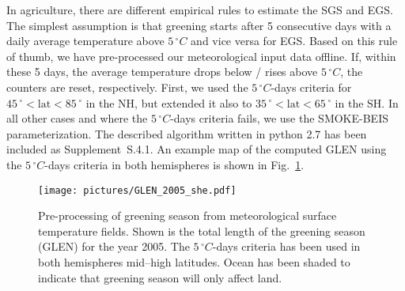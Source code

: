 \documentclass[gmd, manuscript]{copernicus}
\begin{document}
In agriculture, there are different empirical rules to estimate the SGS and EGS. The simplest assumption is that greening starts after 5 consecutive days with a daily average temperature above $5\,\unit{^\circ C}$ and vice versa for EGS. Based on this rule of thumb, we have pre-processed our meteorological input data offline. If, within these 5 days, the average temperature drops below / rises above $5\,\unit{^\circ C}$, the counters are reset, respectively. First, we used the $5\,\unit{^\circ C}$-days criteria for $45\,\unit{^\circ} < \text{lat} < 85\,\unit{^\circ}$ in the NH, but extended it also to $35\,\unit{^\circ} < \text{lat} < 65\,\unit{^\circ}$ in the SH. In all other cases and where the $5\,\unit{^\circ C}$-days criteria fails, we use the SMOKE-BEIS parameterization. The described algorithm written in python 2.7 has been included as Supplement~S.4.1. An example map of the computed GLEN using the $5\,\unit{^\circ C}$-days criteria in both hemispheres is shown in Fig.~\ref{fig:glen_2015_she}.
%
\begin{figure}[t]
  \texttt{[image: pictures/GLEN\_2005\_she.pdf]}
  \caption{Pre-processing of greening season from meteorological surface temperature fields. Shown is the total length of the greening season (GLEN) for the year 2005. The $5\,\unit{^\circ C}$-days criteria has been used in both hemispheres mid--high latitudes. Ocean has been shaded to indicate that greening season will only affect land.}
  \label{fig:glen_2015_she}
\end{figure}
%
\end{document}
